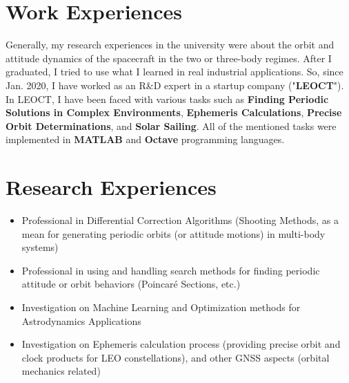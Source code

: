 \documentclass[10pt,a4paper,sans]{moderncv} %
\begin{document}



\section{Work Experiences}
Generally, my research experiences in the university were about the orbit and attitude dynamics of the spacecraft in the two or three-body regimes. After I graduated, I tried to use what I learned in real industrial applications. So, since Jan. 2020, I have worked as an R\&D expert in a startup company ("\textbf{LEOCT}"). In LEOCT, I have been faced with various tasks such as \textbf{Finding Periodic Solutions in Complex Environments}, \textbf{Ephemeris Calculations}, \textbf{Precise Orbit Determinations}, and \textbf{Solar Sailing}. All of the mentioned tasks were implemented in \textbf{MATLAB} and \textbf{Octave} programming languages.


\section{Research Experiences}

\begin{itemize}
\item{Professional in Differential Correction Algorithms (Shooting Methods, as a mean for generating periodic orbits (or attitude motions) in multi-body systems)}
\item{Professional in using and handling search methods for finding periodic attitude or orbit behaviors (Poincar\'e Sections, etc.)}
\item{Investigation on Machine Learning and Optimization methods for Astrodynamics Applications}
\item{Investigation on Ephemeris calculation process (providing precise orbit and clock products for LEO constellations), and other GNSS aspects (orbital mechanics related)}
\end{itemize}

\end{document}
